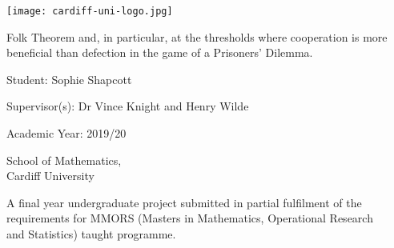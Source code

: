 \begin{titlepage}
	\begin{center}
		\vspace*{0.5cm}
		\texttt{[image: cardiff-uni-logo.jpg]}

		\vspace{1cm}

		\huge
		Folk Theorem and, in particular, at the thresholds where cooperation is more beneficial than defection in the game of a Prisoners' Dilemma.

		\vspace{2cm}

		\large
		Student: Sophie Shapcott

		\vspace{0.5cm}

		Supervisor{(s)}: Dr Vince Knight and Henry Wilde 

		\vspace{0.5cm}

		Academic Year: 2019/20
		
		\vspace{0.5cm}

		School of Mathematics, \\Cardiff University

		\vfill

		\normalsize
		A final year undergraduate project submitted in partial fulfilment of the\\ requirements for MMORS (Masters in Mathematics, Operational Research\\ and Statistics) taught programme.

	\end{center}
\end{titlepage}
